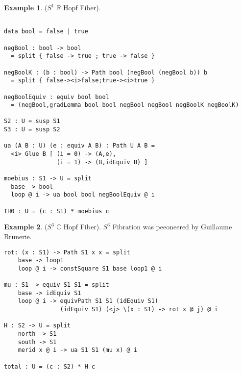 \documentclass{article}
\theoremstyle{definition}
\newtheorem{example}{Example}
\begin{document}
\begin{example} ($S^1$ $\mathbb{R}$ Hopf Fiber).
\begin{lstlisting}

data bool = false | true

negBool : bool -> bool
  = split { false -> true ; true -> false }

negBoolK : (b : bool) -> Path bool (negBool (negBool b)) b
  = split { false-><i>false;true-><i>true }

negBoolEquiv : equiv bool bool
  = (negBool,gradLemma bool bool negBool negBool negBoolK negBoolK)

S2 : U = susp S1
S3 : U = susp S2

ua (A B : U) (e : equiv A B) : Path U A B =
  <i> Glue B [ (i = 0) -> (A,e),
               (i = 1) -> (B,idEquiv B) ]

moebius : S1 -> U = split
  base -> bool
  loop @ i -> ua bool bool negBoolEquiv @ i

TH0 : U = (c : S1) * moebius c
\end{lstlisting}
\end{example}


\newpage
\begin{example} ($S^3$ $\mathbb{C}$  Hopf Fiber).
$S^3$ Fibration was peeoneered by Guillaume Brunerie.
\begin{lstlisting}
rot: (x : S1) -> Path S1 x x = split
    base -> loop1
    loop @ i -> constSquare S1 base loop1 @ i

mu : S1 -> equiv S1 S1 = split
    base -> idEquiv S1
    loop @ i -> equivPath S1 S1 (idEquiv S1)
                (idEquiv S1) (<j> \(x : S1) -> rot x @ j) @ i

H : S2 -> U = split
    north -> S1
    south -> S1
    merid x @ i -> ua S1 S1 (mu x) @ i

total : U = (c : S2) * H c
\end{lstlisting}
\end{example}

\end{document}
